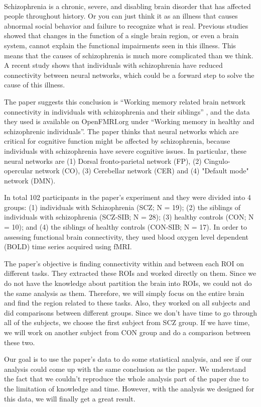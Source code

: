 \documentclass[11pt]{article}
\begin{document}
\paragraph{}
Schizophrenia is a chronic, severe, and disabling brain disorder that has 
affected people throughout history. Or you can just think it as an illness that
causes abnormal social behavior and failure to recognize what is real. Previous 
studies showed that changes in the function of a single brain region, or even a 
brain system, cannot explain the functional impairments seen in this illness. 
This means that the causes of schizophrenia is much more complicated than we 
think. A recent study shows that individuals with schizophrenia have reduced 
connectivity between neural networks, which could be a forward step to solve 
the cause of this illness.\par
The paper suggests this conclusion is ``Working memory related brain network 
connectivity in individuals with schizophrenia and their siblings'' 
\cite{schizophreniabrainconnectivity}, and the data they used is available on 
OpenFMRI.org under ``Working memory in healthy and schizophrenic individuals''. 
The paper thinks that neural networks which are critical for cognitive function
might be affected by schizophrenia, because individuals with schizophrenia have 
severe cognitive issues. In particular, these neural networks are (1) Dorsal 
fronto-parietal network (FP), (2) Cingulo-opercular network (CO), (3) 
Cerebellar network (CER) and (4) "Default mode" network (DMN).\par
In total 102 participants in the paper's experiment and they were divided into 
4 groups: (1) individuals with Schizophrenia (SCZ; N = 19); (2) the siblings of
individuals with schizophrenia (SCZ-SIB; N = 28); (3) healthy controls (CON; N = 10); 
and (4) the siblings of healthy controls (CON-SIB; N = 17). In order to assessing
functional brain connectivity, they used blood oxygen level dependent (BOLD) 
time series acquired using fMRI. \par
The paper's objective is finding connectivity within and between each ROI on 
different tasks. They extracted these ROIs and worked directly on them. Since
we do not have the knowledge about partition the brain into ROIs, we could not 
do the same analysis as them. Therefore, we will simply focus on the entire 
brain and find the region related to these tasks. Also, they worked on all 
subjects and did comparisons between different groups. Since we don't have time 
to go through all of the subjects, we choose the first subject from SCZ group. 
If we have time, we will work on another subject from CON group and do a 
comparison between these two.\par
Our goal is to use the paper's data to do some statistical analysis, and see if
our analysis could come up with the same conclusion as the paper. We understand 
the fact that we couldn't reproduce the whole analysis part of the paper due to
the limitation of knowledge and time. However, with the analysis we designed 
for this data, we will finally get a great result.\par
\end{document}
